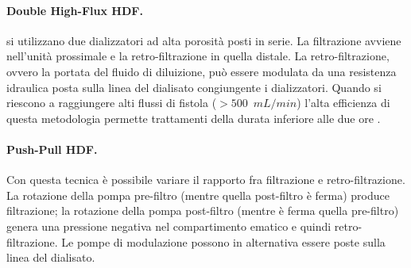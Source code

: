 \paragraph{Double High-Flux HDF.}
si utilizzano due dializzatori ad alta porosità posti in serie. La filtrazione avviene nell'unità prossimale e la retro-filtrazione in quella distale. La retro-filtrazione, ovvero la portata del fluido di diluizione, può essere modulata da una resistenza idraulica posta sulla linea del dialisato congiungente i dializzatori. Quando si riescono a raggiungere alti flussi di fistola ($>500$~$mL/min$) l'alta efficienza di questa metodologia permette trattamenti della durata inferiore alle due ore \cite{miller}.

\paragraph{Push-Pull HDF.}
Con questa tecnica è possibile variare il rapporto fra filtrazione e retro-filtrazione. La rotazione della pompa pre-filtro (mentre quella post-filtro è ferma) produce filtrazione; la rotazione della pompa post-filtro (mentre è ferma quella pre-filtro) genera una pressione negativa nel compartimento ematico e quindi retro-filtrazione. Le pompe di modulazione possono in alternativa essere poste sulla linea del dialisato.

